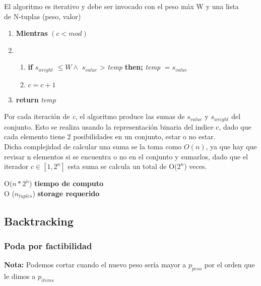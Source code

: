 \documentclass[fleqn, 11pt]{article}
\begin{document}
El algoritmo es iterativo y debe ser invocado con el peso máx W  y una lista \\ de N-tuplas (peso, valor)

\begin{enumerate}
	\item \textbf{Mientras} $(c < mod)$

	\item   \begin{enumerate}
	             \item \textbf{if} \quad \textit{$s_{weight}$} $\le  W \land$ \textit{$s_{value}$}  > \textit{temp}  \quad \textbf{then; } \textit{temp} $ = s_{value} $
	             \item $c = c + 1$
	        \end{enumerate}

    \item \textbf{return} \textit{temp}
\end{enumerate}



Por cada iteración de \textit{c}, el algoritmo produce las sumas de \textit{$s_{value}$} y \textit{$s_{weight}$} del conjunto. Esto se realiza usando la representación binaria del indice c, dado que cada elemento tiene 2 posibilidades en un conjunto, estar o no estar. \\

Dicha complejidad de calcular una suma se la toma como $O(n)$, ya que hay que revisar n elementos si se encuentra o no en el conjunto y sumarlos, dado que el iterador $c \in [1,2^n]$ esta suma se calcula un total de O($2^n$) veces.

\small O($n * 2^n$) \textbf{tiempo de computo}  \\
\small O ($n_{tuples}$) \textbf{storage requerido} \\

\subsection{Backtracking}
\subsubsection{Poda por factibilidad}
\textbf{Nota:} Podemos cortar cuando el nuevo peso sería mayor a $p_{peso}$ por
el orden que le dimos a $p_{items}$
\end{document}
